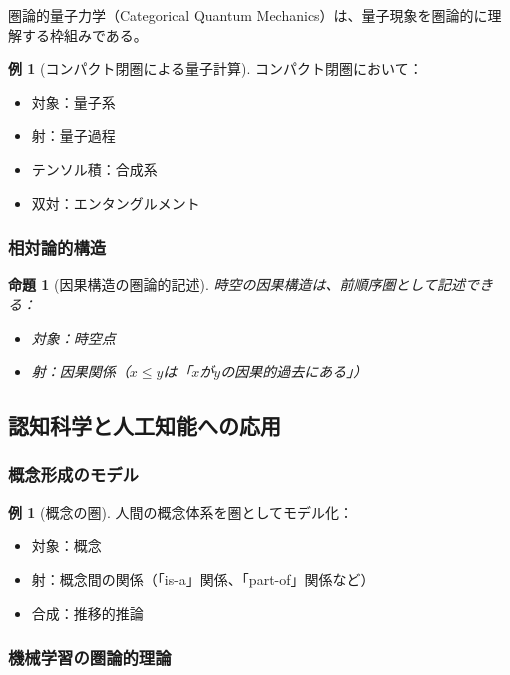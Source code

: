 \documentclass[11pt,a4paper,twocolumn]{ltjsarticle}
\theoremstyle{definition}
\newtheorem{example}[definition]{例}
\theoremstyle{plain}
\newtheorem{proposition}[definition]{命題}
\begin{document}
圏論的量子力学（Categorical Quantum Mechanics）は、量子現象を圏論的に理解する枠組みである。

\begin{example}[コンパクト閉圏による量子計算]
コンパクト閉圏において：
\begin{itemize}
\item 対象：量子系
\item 射：量子過程
\item テンソル積：合成系
\item 双対：エンタングルメント
\end{itemize}
\end{example}

\subsubsection{相対論的構造}

\begin{proposition}[因果構造の圏論的記述]
時空の因果構造は、前順序圏として記述できる：
\begin{itemize}
\item 対象：時空点
\item 射：因果関係（$x \leq y$は「$x$が$y$の因果的過去にある」）
\end{itemize}
\end{proposition}

\subsection{認知科学と人工知能への応用}

\subsubsection{概念形成のモデル}

\begin{example}[概念の圏]
人間の概念体系を圏としてモデル化：
\begin{itemize}
\item 対象：概念
\item 射：概念間の関係（「is-a」関係、「part-of」関係など）
\item 合成：推移的推論
\end{itemize}
\end{example}

\subsubsection{機械学習の圏論的理論}
\end{document}
